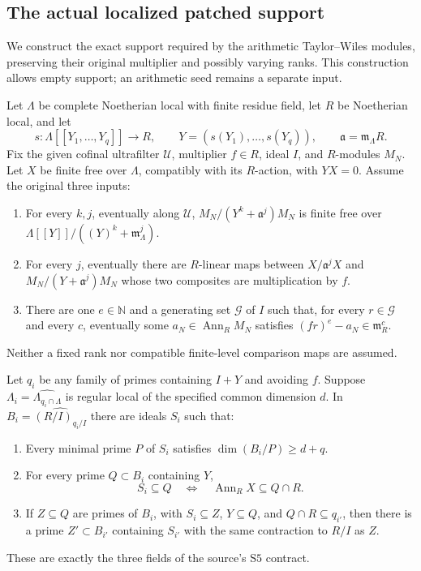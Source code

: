 \subsection{The actual localized patched support}
\label{sec:selmer-patched-support}

We construct the exact support required by the arithmetic
Taylor--Wiles modules, preserving their original multiplier and
possibly varying ranks.  This construction allows empty support;
an arithmetic seed remains a separate input.

Let \(\Lambda\) be complete Noetherian local with finite residue field,
let \(R\) be Noetherian local, and let
\[
 s:\Lambda[[Y_1,\ldots,Y_q]]\longrightarrow R,\qquad
 Y=(s(Y_1),\ldots,s(Y_q)),\qquad
 \mathfrak a=\mathfrak m_\Lambda R.
\]
Fix the given cofinal ultrafilter \(\mathcal U\), multiplier \(f\in R\),
ideal \(I\), and \(R\)-modules \(M_N\).  Let \(X\) be finite free over
\(\Lambda\), compatibly with its \(R\)-action, with \(YX=0\).
Assume the original three inputs:
\begin{enumerate}
\item For every \(k,j\), eventually along \(\mathcal U\),
 \(M_N/(Y^k+\mathfrak a^j)M_N\) is finite free over
 \(\Lambda[[Y]]/((Y)^k+\mathfrak m_\Lambda^j)\).
\item For every \(j\), eventually there are \(R\)-linear maps between
 \(X/\mathfrak a^jX\) and \(M_N/(Y+\mathfrak a^j)M_N\)
 whose two composites are multiplication by \(f\).
\item There are one \(e\in\mathbb N\) and a generating set
 \(\mathcal G\) of \(I\) such that, for every \(r\in\mathcal G\)
 and every \(c\), eventually some \(a_N\in\operatorname{Ann}_RM_N\)
 satisfies \((fr)^e-a_N\in\mathfrak m_R^c\).
\end{enumerate}
Neither a fixed rank nor compatible finite-level comparison maps
are assumed.

\begin{proposition}
\label{prop:selmer-patched-support}
Let \(q_i\) be any family of primes containing \(I+Y\) and avoiding
\(f\).  Suppose
\(\Lambda_i=\widehat{\Lambda_{q_i\cap\Lambda}}\) is regular local
of the specified common dimension \(d\).  In
\(B_i=\widehat{(R/I)_{q_i/I}}\) there are ideals \(S_i\) such that:
\begin{enumerate}
\item Every minimal prime \(P\) of \(S_i\) satisfies
 \(\dim(B_i/P)\geq d+q\).
\item For every prime \(Q\subset B_i\) containing \(Y\),
 \[
 S_i\subseteq Q
 \quad\Longleftrightarrow\quad
 \operatorname{Ann}_RX\subseteq Q\cap R.
 \]
\item If \(Z\subseteq Q\) are primes of \(B_i\), with
 \(S_i\subseteq Z\), \(Y\subseteq Q\), and
 \(Q\cap R\subseteq q_{i'}\), then there is a prime
 \(Z'\subset B_{i'}\) containing \(S_{i'}\) with the same
 contraction to \(R/I\) as \(Z\).
\end{enumerate}
These are exactly the three fields of the source's
\(\mathrm{S5}\) contract.
\end{proposition}

